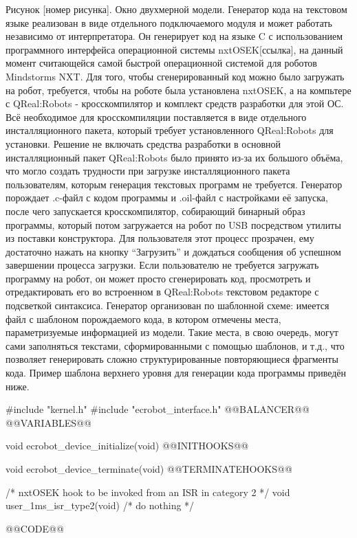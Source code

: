 Рисунок [номер рисунка]. Окно двухмерной модели.
	Генератор кода на текстовом языке реализован в виде отдельного подключаемого модуля и может работать независимо от интерпретатора. Он генерирует код на языке C с использованием программного интерфейса операционной системы nxtOSEK[ссылка], на данный момент считающейся самой быстрой операционной системой для роботов Mindstorms NXT. Для того, чтобы сгенерированный код можно было загружать на робот, требуется, чтобы на роботе была установлена nxtOSEK, а на компьтере с QReal:Robots - кросскомпилятор и комплект средств разработки для этой ОС. Всё необходимое для кросскомпиляции поставляется в виде отдельного инсталляционного пакета, который требует установленного QReal:Robots для установки. Решение не включать средства разработки в основной инсталляционный пакет QReal:Robots было принято из-за их большого объёма, что могло создать трудности при загрузке инсталляционного пакета пользователям, которым генерация текстовых программ не требуется. Генератор порождает .c-файл с кодом программы и .oil-файл с настройками её запуска, после чего запускается кросскомпилятор, собирающий бинарный образ программы, который потом загружается на робот по USB посредством утилиты из поставки конструктора. Для пользователя этот процесс прозрачен, ему достаточно нажать на кнопку “Загрузить” и дождаться сообщения об успешном завершении процесса загрузки. Если пользователю не требуется загружать программу на робот, он может просто сгенерировать код,  просмотреть и отредактировать его во встроенном в QReal:Robots текстовом редакторе с подсветкой синтаксиса.
	Генератор организован по шаблонной схеме: имеется файл с шаблоном порождаемого кода, в котором отмечены места, параметризуемые информацией из модели. Такие места, в свою очередь, могут сами заполняться текстами, сформированными с помощью шаблонов, и т.д., что позволяет генерировать сложно структурированные  повторяющиеся фрагменты кода. Пример шаблона верхнего уровня для генерации кода программы приведён ниже.

#include "kernel.h"
#include "ecrobot_interface.h"
@@BALANCER@@
@@VARIABLES@@

void ecrobot_device_initialize(void)
{
@@INITHOOKS@@
}

void ecrobot_device_terminate(void)
{
@@TERMINATEHOOKS@@
}

/* nxtOSEK hook to be invoked from an ISR in category 2 */
void user_1ms_isr_type2(void){ /* do nothing */ }

@@CODE@@

